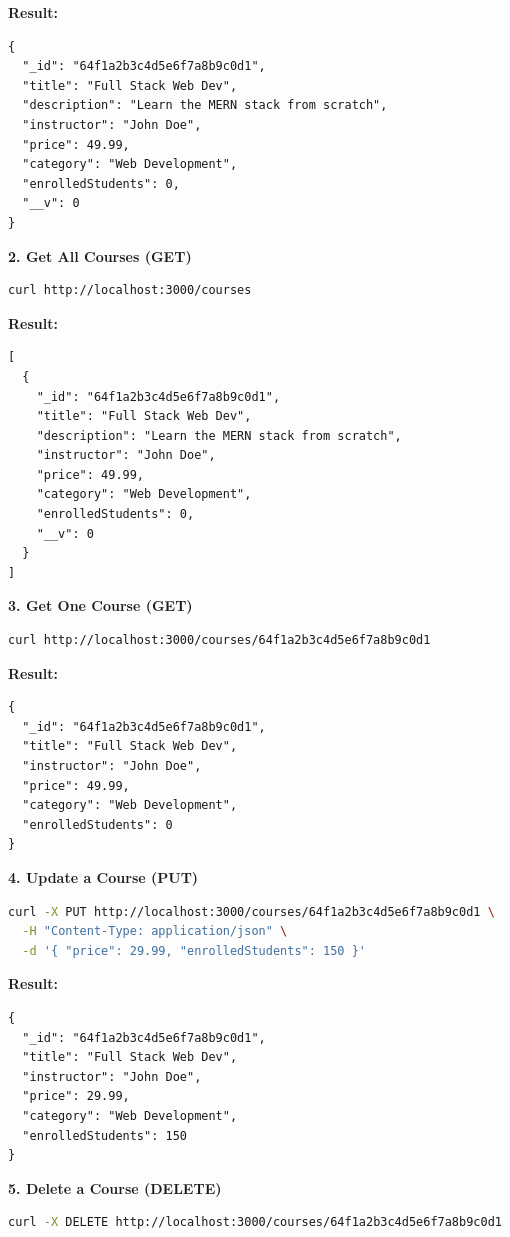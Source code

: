 \documentclass[12pt,a4paper]{article}
\begin{document}
\textbf{Result:}
\begin{lstlisting}
{
  "_id": "64f1a2b3c4d5e6f7a8b9c0d1",
  "title": "Full Stack Web Dev",
  "description": "Learn the MERN stack from scratch",
  "instructor": "John Doe",
  "price": 49.99,
  "category": "Web Development",
  "enrolledStudents": 0,
  "__v": 0
}
\end{lstlisting}

\textbf{2. Get All Courses (GET)}
\begin{lstlisting}[language=bash]
curl http://localhost:3000/courses
\end{lstlisting}

\textbf{Result:}
\begin{lstlisting}
[
  {
    "_id": "64f1a2b3c4d5e6f7a8b9c0d1",
    "title": "Full Stack Web Dev",
    "description": "Learn the MERN stack from scratch",
    "instructor": "John Doe",
    "price": 49.99,
    "category": "Web Development",
    "enrolledStudents": 0,
    "__v": 0
  }
]
\end{lstlisting}

\textbf{3. Get One Course (GET)}
\begin{lstlisting}[language=bash]
curl http://localhost:3000/courses/64f1a2b3c4d5e6f7a8b9c0d1
\end{lstlisting}

\textbf{Result:}
\begin{lstlisting}
{
  "_id": "64f1a2b3c4d5e6f7a8b9c0d1",
  "title": "Full Stack Web Dev",
  "instructor": "John Doe",
  "price": 49.99,
  "category": "Web Development",
  "enrolledStudents": 0
}
\end{lstlisting}

\textbf{4. Update a Course (PUT)}
\begin{lstlisting}[language=bash]
curl -X PUT http://localhost:3000/courses/64f1a2b3c4d5e6f7a8b9c0d1 \
  -H "Content-Type: application/json" \
  -d '{ "price": 29.99, "enrolledStudents": 150 }'
\end{lstlisting}

\textbf{Result:}
\begin{lstlisting}
{
  "_id": "64f1a2b3c4d5e6f7a8b9c0d1",
  "title": "Full Stack Web Dev",
  "instructor": "John Doe",
  "price": 29.99,
  "category": "Web Development",
  "enrolledStudents": 150
}
\end{lstlisting}

\textbf{5. Delete a Course (DELETE)}
\begin{lstlisting}[language=bash]
curl -X DELETE http://localhost:3000/courses/64f1a2b3c4d5e6f7a8b9c0d1
\end{lstlisting}
\end{document}
